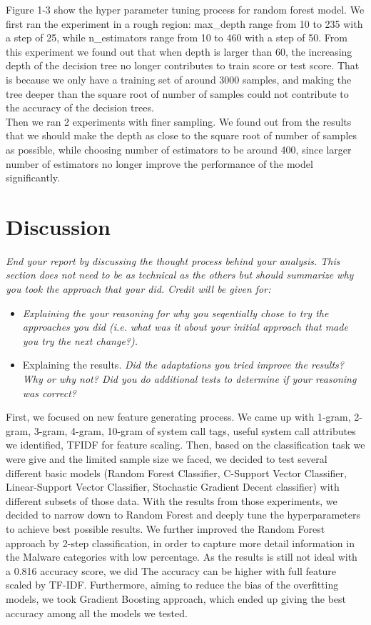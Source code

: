 \documentclass[11pt]{article}
\begin{document}
Figure 1-3 show the hyper parameter tuning process for random forest model. We first ran the experiment in a rough region: max\_depth range from 10 to 235 with a step of 25, while n\_estimators range from 10 to 460 with a step of 50. From this experiment we found out that when depth is larger than 60, the increasing depth of the decision tree no longer contributes to train score or test score. That is because we only have a training set of around 3000 samples, and making the tree deeper than the square root of number of samples could not contribute to the accuracy of the decision trees. \\
Then we ran 2 experiments with finer sampling. We found out from the results that we should make the depth as close to the square root of number of samples as possible, while choosing number of estimators to be around 400, since larger number of estimators no longer improve the performance of the model significantly. 

\section{Discussion} 


\textit{End your report by discussing the thought process behind your
analysis. This section does not need to be as technical as the others 
but should summarize why you took the approach that your did. Credit will be given for:
}
  \begin{itemize}
  \item \textit{Explaining the your reasoning for why you seqentially chose to
    try the approaches you did (i.e. what was it about your initial
    approach that made you try the next change?).  }
  \item Explaining the results.  \textit{Did the adaptations you tried improve
    the results?  Why or why not?  Did you do additional tests to
    determine if your reasoning was correct?  }
  \end{itemize}
 
First, we focused on new feature generating process. We came up with 1-gram, 2-gram, 3-gram, 4-gram, 10-gram of system call tags, useful system call attributes we identified, TFIDF for feature scaling. Then, based on the classification task we were give and the limited sample size we faced, we decided to test several different basic models (Random Forest Classifier, C-Support Vector Classifier, Linear-Support Vector Classifier, Stochastic Gradient Decent classifier) with different subsets of those data. With the results from those experiments, we decided to narrow down to Random Forest and deeply tune the hyperparameters to achieve best possible results. We further improved the Random Forest approach by 2-step classification, in order to capture more detail information in the Malware categories with low percentage. As the results is still not ideal with a 0.816 accuracy score, we did The accuracy can be higher with full feature scaled by TF-IDF. Furthermore, aiming to reduce the bias of the overfitting models, we took Gradient Boosting approach, which ended up giving the best accuracy among all the models we tested. 
\end{document}
